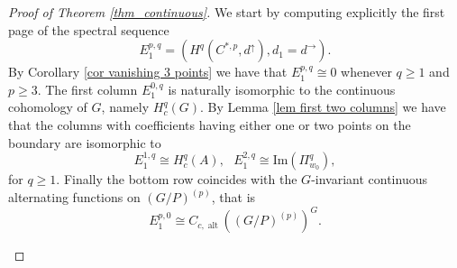 \documentclass[a4paper]{amsart}
\theoremstyle{definition}
\theoremstyle{remark}
\theoremstyle{TheoremNum}
\DeclareMathOperator{\C}{\mathrm{C}} %
\DeclareMathOperator{\alt}{\mathrm{alt}}
\begin{document}
\begin{proof}[Proof of Theorem \ref{thm_continuous}]

We start by computing explicitly the first page of the spectral sequence
$$
E_1^{p,q}=(H^q(C^{\ast,p},d^\uparrow),d_1=d^\rightarrow). 
$$
By Corollary \ref{cor vanishing 3 points} we have that $E_1^{p,q} \cong 0$ whenever $q \geq 1$ and $p \geq 3$. The first column $E_1^{0,q}$ is naturally isomorphic to the continuous cohomology of $G$, namely $H^q_c(G)$. By Lemma \ref{lem first two columns} we have that the columns with coefficients having either one or two points on the boundary are isomorphic to 
$$
E^{1,q}_1 \cong H^q_c(A), \ \ \ E^{2,q}_1 \cong \mathrm{Im}(\Pi^q_{w_0}),
$$
for $q \geq 1$.
Finally the bottom row coincides with the $G$-invariant continuous alternating functions on $(G/P)^{(p)}$, that is
$$
E^{p,0}_1 \cong C_{c,\alt}((G/P)^{(p)})^G.
$$ 

\begin{figure}[!h]
\centering
{}
\end{figure}
\end{proof}
\end{document}
